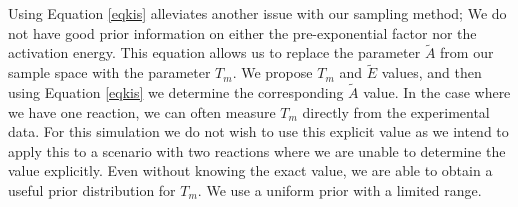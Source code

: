 Using Equation \ref{eqkis} alleviates another issue with our sampling method; We do not have good prior information on either the pre-exponential factor nor the activation energy. This equation allows us to replace the parameter $\tilde{A}$ from our sample space with the parameter $T_m$. We propose $T_m$ and $\tilde{E}$ values, and then using Equation \ref{eqkis} we determine the corresponding $\tilde{A}$ value. In the case where we have one reaction, we can often measure $T_m$ directly from the experimental data. For this simulation we do not wish to use this explicit value as we intend to apply this to a scenario with two reactions where we are unable to determine the value explicitly. Even without knowing the exact value, we are able to obtain a useful prior distribution for $T_m$. We use a uniform prior with a limited range.\\
